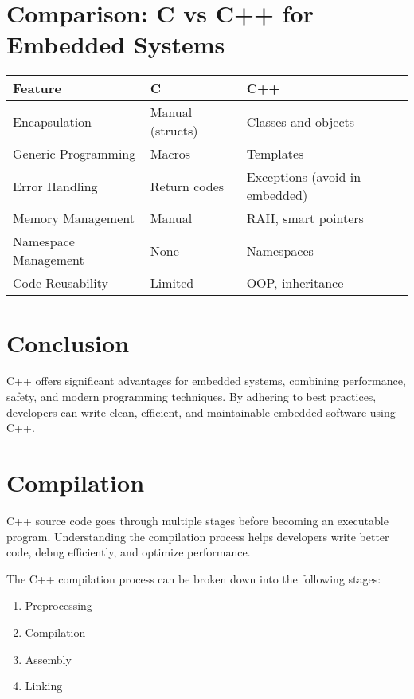 \section{Comparison: C vs C++ for Embedded Systems}
\begin{center}
\begin{tabular}{|l|l|l|}
\hline
\textbf{Feature}      & \textbf{C}                    & \textbf{C++}                  \\ \hline
Encapsulation         & Manual (structs)              & Classes and objects           \\ \hline
Generic Programming   & Macros                        & Templates                     \\ \hline
Error Handling        & Return codes                  & Exceptions (avoid in embedded)\\ \hline
Memory Management     & Manual                        & RAII, smart pointers          \\ \hline
Namespace Management  & None                          & Namespaces                    \\ \hline
Code Reusability      & Limited                       & OOP, inheritance              \\ \hline
\end{tabular}
\end{center}

\section{Conclusion}
C++ offers significant advantages for embedded systems, combining performance, safety, and modern programming techniques. By adhering to best practices, developers can write clean, efficient, and maintainable embedded software using C++.


\section{Compilation}
C++ source code goes through multiple stages before becoming an executable program. Understanding the compilation process helps developers write better code, debug efficiently, and optimize performance.

The C++ compilation process can be broken down into the following stages:
\begin{enumerate}
    \item Preprocessing
    \item Compilation
    \item Assembly
    \item Linking
\end{enumerate}

